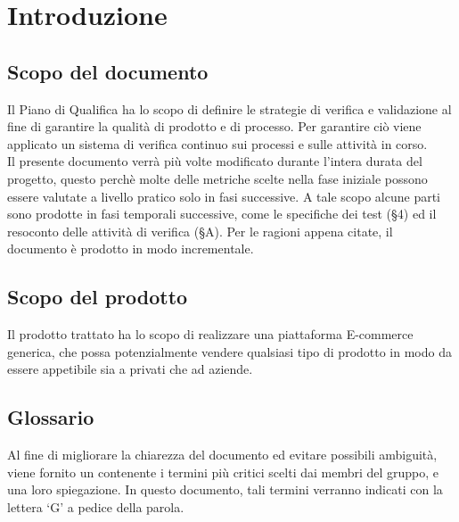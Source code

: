 \section{Introduzione}

\subsection{Scopo del documento}
Il Piano di Qualifica ha lo scopo di definire le strategie di verifica e validazione al fine di garantire la qualità di prodotto e di processo. Per garantire ciò viene applicato un sistema di verifica continuo sui processi e sulle attività in corso.\\
Il presente documento verrà più volte modificato durante l'intera durata del progetto, questo perchè molte delle metriche scelte nella fase iniziale possono essere valutate a livello pratico solo in fasi successive. A tale scopo alcune parti sono prodotte in fasi temporali successive, come le specifiche dei test (§4) ed il resoconto delle attività di verifica (§A). Per le ragioni appena citate, il documento è prodotto in modo incrementale.

\subsection{Scopo del prodotto}
Il prodotto trattato ha lo scopo di realizzare una piattaforma E-commerce generica, che possa potenzialmente vendere qualsiasi tipo di prodotto in modo da essere appetibile sia a privati che ad aziende.

\subsection{Glossario}
Al fine di migliorare la chiarezza del documento ed evitare possibili ambiguità, viene fornito un
\Glossario{} contenente i termini più critici scelti dai membri del gruppo, e una loro spiegazione.
In questo documento, tali termini verranno indicati con la lettera `G’ a pedice della parola.

